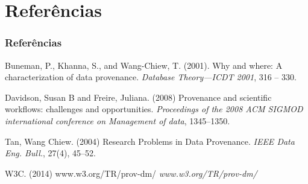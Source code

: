 \documentclass{beamer}
\begin{document}
\section{Refer\^encias}

\begin{frame}
\frametitle{Refer\^encias}
\footnotesize{
\begin{thebibliography}{99} %

 Buneman, P., Khanna, S., and Wang-Chiew, T. (2001).
\newblock Why and where: A characterization of data provenance.
\newblock \emph{Database Theory—ICDT 2001}, 316 -- 330.

 Davidson, Susan B and Freire, Juliana. (2008)
\newblock Provenance and scientific workflows: challenges and opportunities.
\newblock \emph{Proceedings of the 2008 ACM SIGMOD international conference on Management of data}, 1345--1350.

 Tan, Wang Chiew. (2004)
\newblock Research Problems in Data Provenance.
\newblock \emph{IEEE Data Eng. Bull.}, 27(4), 45--52.

 W3C. (2014)
\newblock www.w3.org/TR/prov-dm/
\newblock \emph{www.w3.org/TR/prov-dm/}

\end{thebibliography}
}
\end{frame}
\end{document}
